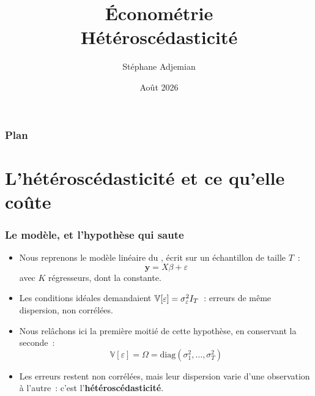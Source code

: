 \documentclass[10pt]{beamer}
\begin{document}
\title{Économétrie\\\small{Hétéroscédasticité}}
\author[S. Adjemian]{Stéphane Adjemian}
\date{Août 2026}

\begin{frame}
  \titlepage{}
\end{frame}

\begin{frame}
  \frametitle{Plan}
  \tableofcontents
\end{frame}


\section{L'hétéroscédasticité et ce qu'elle coûte}

\begin{frame}
  \frametitle{Le modèle, et l'hypothèse qui saute}

  \begin{itemize}

  \item Nous reprenons le modèle linéaire du , écrit sur un
    échantillon de taille $T$~:
    \[
      \mathbf y = X\beta + \varepsilon
    \]
    avec $K$ régresseurs, dont la constante.\newline

  \item Les conditions idéales demandaient $\mathbb V[\varepsilon] =
    \sigma_{\varepsilon}^2 I_T$~: erreurs de même dispersion, non corrélées.\newline

  \item Nous relâchons ici la première moitié de cette hypothèse, en conservant
    la seconde~:
    \[
      \mathbb V[\varepsilon] = \Omega = \mathrm{diag}\left(\sigma_1^2, \ldots,
        \sigma_T^2\right)
    \]

  \item Les erreurs restent non corrélées, mais leur dispersion varie d'une
    observation à l'autre~: c'est l'\textbf{hétéroscédasticité}.\newline

  \end{itemize}


\end{frame}
\end{document}
